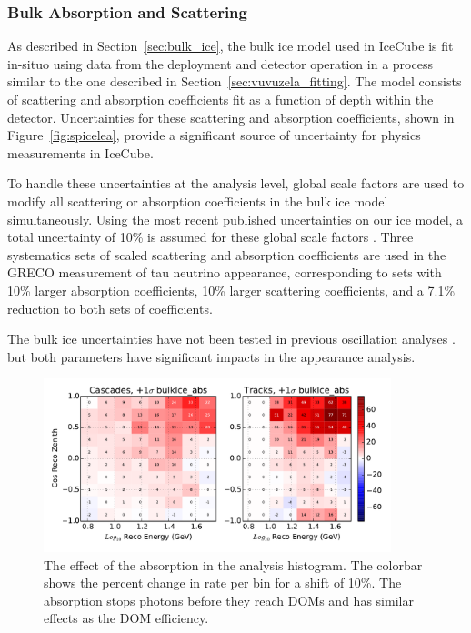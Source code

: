 \subsubsection{Bulk Absorption and Scattering}
\label{subsubsec:bulkice}
As described in Section~\ref{sec:bulk_ice}, the bulk ice model used in IceCube is fit in-situo using data from the deployment and detector operation in a process similar to the one described in Section~\ref{sec:vuvuzela_fitting}.
The model consists of scattering and absorption coefficients fit as a function of depth within the detector.
Uncertainties for these scattering and absorption coefficients, shown in Figure~\ref{fig:spicelea}, provide a significant source of uncertainty for physics measurements in IceCube.

To handle these uncertainties at the analysis level, global scale factors are used to modify all scattering or absorption coefficients in the bulk ice model simultaneously.
Using the most recent published uncertainties on our ice model, a total uncertainty of 10\% is assumed for these global scale factors \cite{IceCube-SpiceLea}.
Three systematics sets of scaled scattering and absorption coefficients are used in the GRECO measurement of tau neutrino appearance, corresponding to sets with 10\% larger absorption coefficients, 10\% larger scattering coefficients, and a 7.1\% reduction to both sets of coefficients.

The bulk ice uncertainties have not been tested in previous oscillation analyses \cite{IceCube-Oscillation2013,IceCube-Oscillation2015,IceCube-Oscillation2018}. but both parameters have significant impacts in the appearance analysis.

\begin{figure}
\centering
\includegraphics[width=0.9\textwidth]{systematics/bulkIce_abs_variation.pdf} 
\caption[Effect of the absorption in the analysis histogram]{The effect of the absorption in the analysis histogram. The colorbar shows the percent change in rate per bin for a shift of 10\%. The absorption stops photons before they reach DOMs and has similar effects as the DOM efficiency.}
\label{fig:systematics_absorption}
\end{figure}


